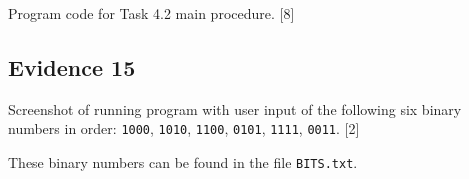 Program code for Task 4.2 main procedure. \hfill{} {[}8{]}

\subsection*{Evidence 15 }

Screenshot of running program with user input of the following six
binary numbers in order: \texttt{1000}, \texttt{1010}, \texttt{1100},
\texttt{0101}, \texttt{1111}, \texttt{0011}. \hfill{}{[}2{]}

These binary numbers can be found in the file \texttt{BITS.txt}.